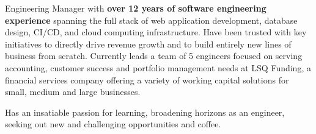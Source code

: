 

\begin{cvparagraph}

Engineering Manager with \textbf{over 12 years of software engineering experience} spanning the full stack of web application development, database design, CI/CD, and cloud computing infrastructure. Have been trusted with key initiatives to directly drive revenue growth and to build entirely new lines of business from scratch. Currently leads a team of 5 engineers focused on serving accounting, customer success and portfolio management needs at LSQ Funding, a financial services company offering a variety of working capital solutions for small, medium and large businesses.

Has an insatiable passion for learning, broadening horizons as an engineer, seeking out new and challenging opportunities and coffee.

\end{cvparagraph}
